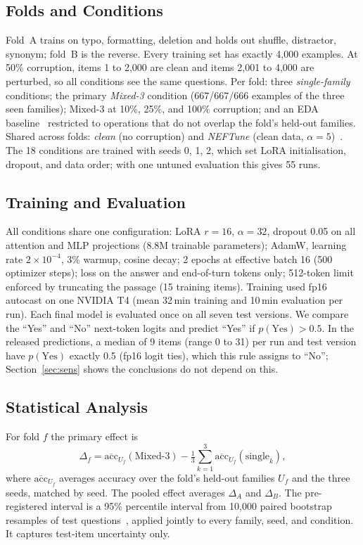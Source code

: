 \documentclass[conference]{IEEEtran}
\newcommand{\pfam}[1]{\textsf{#1}}
\begin{document}
\subsection{Folds and Conditions}
Fold~A trains on \pfam{typo}, \pfam{formatting}, \pfam{deletion} and holds out \pfam{shuffle}, \pfam{distractor}, \pfam{synonym}; fold~B is the reverse. Every training set has exactly 4{,}000 examples. At 50\% corruption, items 1 to 2{,}000 are clean and items 2{,}001 to 4{,}000 are perturbed, so all conditions see the same questions. Per fold: three \emph{single-family} conditions; the primary \emph{Mixed-3} condition (667/667/666 examples of the three seen families); Mixed-3 at 10\%, 25\%, and 100\% corruption; and an EDA baseline~\cite{wei2019eda} restricted to operations that do not overlap the fold's held-out families. Shared across folds: \emph{clean} (no corruption) and \emph{NEFTune} (clean data, $\alpha{=}5$)~\cite{jain2024neftune}. The 18 conditions are trained with seeds 0, 1, 2, which set LoRA initialisation, dropout, and data order; with one untuned evaluation this gives 55 runs.

\subsection{Training and Evaluation}
All conditions share one configuration: LoRA $r{=}16$, $\alpha{=}32$, dropout 0.05 on all attention and MLP projections (8.8M trainable parameters); AdamW, learning rate $2{\times}10^{-4}$, 3\% warmup, cosine decay; 2 epochs at effective batch 16 (500 optimizer steps); loss on the answer and end-of-turn tokens only; 512-token limit enforced by truncating the passage (15 training items). Training used fp16 autocast on one NVIDIA T4 (mean 32\,min training and 10\,min evaluation per run). Each final model is evaluated once on all seven test versions. We compare the ``Yes'' and ``No'' next-token logits and predict ``Yes'' if $p(\text{Yes}) > 0.5$. In the released predictions, a median of 9 items (range 0 to 31) per run and test version have $p(\text{Yes})$ exactly 0.5 (fp16 logit ties), which this rule assigns to ``No''; Section~\ref{sec:sens} shows the conclusions do not depend on this.

\subsection{Statistical Analysis}
For fold $f$ the primary effect is
\begin{equation}
\Delta_f = \overline{\mathrm{acc}}_{U_f}(\text{Mixed-3}) - \tfrac{1}{3}\textstyle\sum_{k=1}^{3} \overline{\mathrm{acc}}_{U_f}(\text{single}_k),
\end{equation}
where $\overline{\mathrm{acc}}_{U_f}$ averages accuracy over the fold's held-out families $U_f$ and the three seeds, matched by seed. The pooled effect averages $\Delta_A$ and $\Delta_B$. The pre-registered interval is a 95\% percentile interval from 10{,}000 paired bootstrap resamples of test questions~\cite{efron1993bootstrap,koehn2004statistical}, applied jointly to every family, seed, and condition. It captures test-item uncertainty only.
\end{document}
